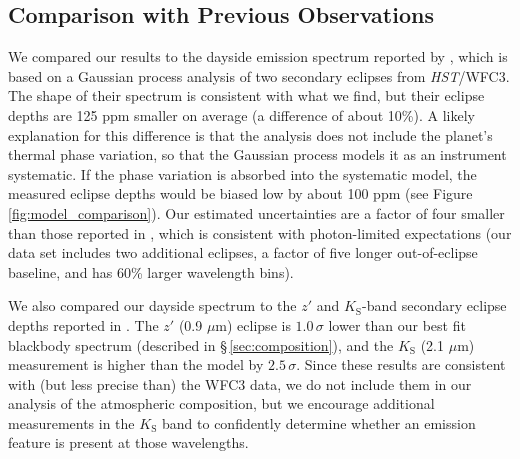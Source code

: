 \documentclass[twocolumn]{aastex61}
\newcommand{\project}[1]{\textsl{#1}}
\newcommand{\HST}{\project{HST}}
\begin{document}
\subsection{Comparison with Previous Observations}
We compared our results to the dayside emission spectrum reported by \cite{cartier17}, which is based on a Gaussian process analysis of two secondary eclipses from \HST/WFC3. The shape of their spectrum is consistent with what we find, but their eclipse depths are 125 ppm smaller on average (a difference of about 10\%). A likely explanation for this difference is that the \cite{cartier17} analysis does not include the planet's thermal phase variation, so that the Gaussian process models it as an instrument systematic.  If the phase variation is absorbed into the systematic model, the measured eclipse depths would be biased low by about 100 ppm (see Figure\,\ref{fig:model_comparison}).  Our estimated uncertainties are a factor of four smaller than those reported in \cite{cartier17}, which is consistent with photon-limited expectations (our data set includes two additional eclipses, a factor of five longer out-of-eclipse baseline, and has 60\% larger wavelength bins).


We also compared our dayside spectrum to the $z'$ and $K_\mathrm{S}$-band secondary eclipse depths reported in \cite{delrez18}. The $z'$ (0.9 $\mu$m) eclipse is $1.0\,\sigma$ lower than our best fit blackbody spectrum (described in \S\,\ref{sec:composition}), and the $K_\mathrm{S}$ (2.1 $\mu$m) measurement is higher than the model by $2.5\,\sigma$. Since these results are consistent with (but less precise than) the WFC3 data, we do not include them in our analysis of the atmospheric composition, but we encourage additional measurements in the $K_\mathrm{S}$ band to confidently determine whether an emission feature is present at those wavelengths.
\end{document}
